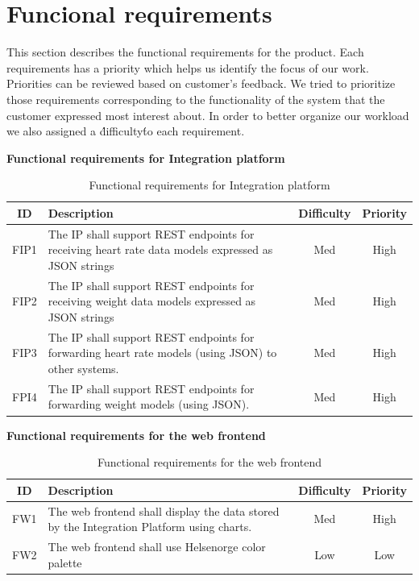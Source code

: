 
\section{Funcional requirements}
\label{section:functionalreq}

This section describes the functional requirements for the product.
Each requirements has a priority which helps us identify the focus of our work.
Priorities can be reviewed based on customer's feedback. We tried to prioritize those requirements corresponding to the functionality of the system that the customer expressed most interest about. In order to better organize our workload we also assigned a \'difficulty\' to each requirement.

\textbf{Functional requirements for Integration platform}

\begin{table}[H]
\begin{center}
\begin{tabular}{ | c | p{9cm} | c | c | }
  \hline
  ID & Description & Difficulty & Priority\\
  \hline\noalign{\smallskip}\noalign{\smallskip}\hline
  FIP1	& The IP shall support REST endpoints for receiving heart rate data models expressed as JSON strings   & Med	& High \\
  FIP2	& The IP shall support REST endpoints for receiving weight data models expressed as JSON strings       & Med	& High \\
  FIP3	& The IP shall support REST endpoints for forwarding heart rate models (using JSON) to other systems.  & Med	& High \\
  FPI4	& The IP shall support REST endpoints for forwarding weight models (using JSON).                       & Med	& High \\
  \hline
\end{tabular}
\end{center}
\caption{Functional requirements for Integration platform}
\label{table:reqip}
\end{table}

\textbf{Functional requirements for the web frontend}

\begin{table}[H]
\begin{center}
\begin{tabular}{ | c | p{9cm} | c | c |}
  \hline
  ID & Description & Difficulty & Priority\\
  \hline\noalign{\smallskip}\noalign{\smallskip}\hline
  FW1	& The web frontend shall display the data stored by the Integration Platform using charts.	& Med	& High \\
  FW2	& The web frontend shall use Helsenorge color palette                                       & Low	& Low \\
  \hline
\end{tabular}
\end{center}
\caption{Functional requirements for the web frontend}
\label{table:reqfrontend}
\end{table}

